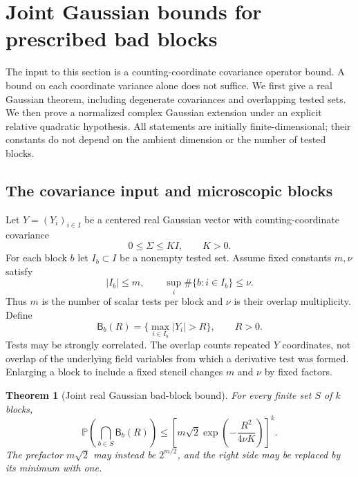 \documentclass[11pt]{article}
\newtheorem{theorem}{Theorem}
\theoremstyle{remark}\newtheorem{remark}[theorem]{Remark}
\newcommand{\norm}[1]{\left\lVert#1\right\rVert}
\begin{document}

\section{Joint Gaussian bounds for prescribed bad blocks}
\label{jt-section}

The input to this section is a counting-coordinate covariance
operator bound. A bound on each coordinate variance alone does
not suffice. We first give a real Gaussian theorem, including
degenerate covariances and overlapping tested sets. We then prove
a normalized complex Gaussian extension under an explicit
relative quadratic hypothesis. All statements are initially
finite-dimensional; their constants do not depend on the ambient
dimension or the number of tested blocks.

\subsection{The covariance input and microscopic blocks}
\label{jt-input}

Let $Y=(Y_i)_{i\in I}$ be a centered real Gaussian vector with
counting-coordinate covariance
\begin{equation}\label{jt-covariance}
 0\le\Sigma\le K I,\qquad K>0.
\end{equation}
For each block $b$ let $I_b\subset I$ be a nonempty tested set.
Assume fixed constants $m,\nu$ satisfy
\begin{equation}\label{jt-incidence}
 |I_b|\le m,\qquad
 \sup_i\#\{b:i\in I_b\}\le\nu.
\end{equation}
Thus $m$ is the number of scalar tests per block and $\nu$ is
their overlap multiplicity. Define
\begin{equation}\label{jt-bad-event}
 \mathsf B_b(R)=\{\max_{i\in I_b}|Y_i|>R\},\qquad R>0.
\end{equation}
Tests may be strongly correlated. The overlap counts repeated
$Y$ coordinates, not overlap of the underlying field variables
from which a derivative test was formed. Enlarging a block to
include a fixed stencil changes $m$ and $\nu$ by fixed factors.

\begin{theorem}[Joint real Gaussian bad-block bound]
\label{jt-real-theorem}
For every finite set $S$ of $k$ blocks,
\begin{equation}\label{jt-real-bound}
 \mathbb P\!\left(\bigcap_{b\in S}\mathsf B_b(R)\right)
 \le\left[
 m\sqrt2\exp\!\left(-\frac{R^2}{4\nu K}\right)
 \right]^k.
\end{equation}
The prefactor $m\sqrt2$ may instead be $2^{m/2}$, and the
right side may be replaced by its minimum with one.
\end{theorem}
\end{document}
